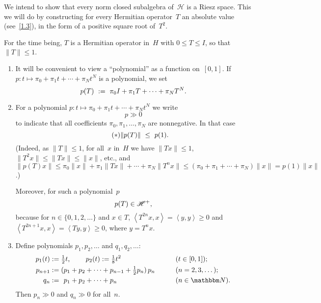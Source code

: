 \documentclass[main.tex]{subfiles}
\begin{document}
\noindent We intend to show that
every norm closed subalgebra of~$\mathscr H$
is a Riesz space.
This we will do by constructing
for every Hermitian operator~$T$
an absolute value (see~\ref{1.3}),
in the form of a positive square root of~$T^2$.
%
%
\begin{psec}{5.18}%
For the time being,
$T$ is a Hermitian operator in~$H$ with $0\leq T\leq I$,
so that $\| T\|\leq 1$.
\begin{enumerate}
\item \label{5.18-1}
It will be convenient to view a ``polynomial'' 
as a function on~$[0,1]$.
If $p\colon t\mapsto \pi_0 + \pi_1 t + \dotsb + \pi_N t^N$
is a polynomial, we set
\begin{equation*}
p(T)\ :=\ \pi_0 I + \pi_1 T + \dotsb + \pi_N T^N\text{.}
\end{equation*}
%
\item \label{5.18-2}
For a polynomial $p\colon t\mapsto \pi_0 + \pi_1 t +\dotsb + \pi_N t^N$
we write
\begin{equation*}
p \gg 0
\end{equation*}
to indicate that all coefficients $\pi_0,\pi_1,\dotsc,\pi_N$
are nonnegative.
In that case
\begin{equation}
\tag{$*$}\label{eq5.18-2}
\|p(T)\| \ \leq \ p(1)\text{.}
\end{equation}
(Indeed,
as $\|T\|\leq 1$, for all~$x$ in~$H$
we have $\|Tx\|\leq 1$,
$\|T^2 x\|\leq \|T x\|\leq \| x\|$,
etc., and $\|p(T)x\|\leq \pi_0 \|x\|+\pi_1 \|Tx\| + \dotsb +\pi_N\|T^n x\|
\leq (\pi_0+\pi_1+\dotsb + \pi_N) \|x \|= p(1)\|x\|$.)

Moreover,
for such a polynomial~$p$
\begin{equation*}
p(T)\in\mathscr{H}^+\text{,}
\end{equation*}
because for $n\in\{0,1,2,\dotsc\}$
and $x\in T$,
$\left< T^{2n}x,x\right>=\left<y,y\right>\geq 0$
and $\left< T^{2n+1} x,x\right>=\left< Ty,y\right>\geq 0$,
where $y=T^n x$.
%
\item \label{1.18-3}
Define polynomials $p_1,p_2,\dotsc$ and $q_1,q_2,\dotsc$:
\begin{alignat*}{2}
 p_1(t)&:={\textstyle\frac{1}{2} t\htam{, }\qquad
 p_2(t):=\frac{1}{8}} t^2\qquad &&(t\in[0,1])\htam{;}\\
p_{n+1}&:=(p_1+p_2+\dotsb+p_{n-1}+{\textstyle\frac{1}{2}}p_n)\, p_n
\qquad&&(n=2,3,\dotsc)\htam{;}\\
    q_n&:=\phantom{(}p_1+p_2+\dotsb+p_n\qquad&&(n\in \N)\htam{.}
\end{alignat*}
Then $p_n\gg 0$ and $q_n\gg 0$ for all~$n$.


\end{enumerate}
\end{psec}
\end{document}
